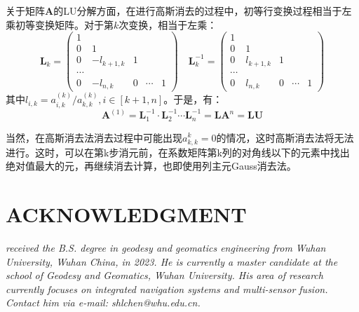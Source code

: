 \documentclass[12pt, onecolumn]{article}
\newcommand\normf{\fangsong}
\begin{document}
	关于矩阵$\boldsymbol{A}$的LU分解方面，在进行高斯消去的过程中，初等行变换过程相当于左乘初等变换矩阵。对于第$k$次变换，相当于左乘：
	\begin{equation}
	\boldsymbol{L}_k=\begin{pmatrix}
	1\\
	0&1\\
	0&-l_{k+1,k}&1\\
	\cdots\\
	0&-l_{n,k}&0&\cdots&1
	\end{pmatrix}
	\quad
	\boldsymbol{L}_k^{-1}=\begin{pmatrix}
		1\\
		0&1\\
		0&l_{k+1,k}&1\\
		\cdots\\
		0&l_{n,k}&0&\cdots&1
		\end{pmatrix}
	\end{equation}
	其中$l_{i,k}=a^{(k)}_{i,k}/a^{(k)}_{k,k},i\in[k+1,n]$。于是，有：
	\begin{equation}
	\boldsymbol{A}^{(1)}=\boldsymbol{L}_1^{-1}\cdot\boldsymbol{L}_2^{-1}\cdots
	\boldsymbol{L}_n^{-1}=\boldsymbol{L}\boldsymbol{A}^{n}=\boldsymbol{LU}
	\end{equation}
	
	当然，在高斯消去法消去过程中可能出现$a_{k,k}^{k}=0$的情况，这时高斯消去法将无法进行。这时，可以在第k步消元前，在系数矩阵第k列的对角线以下的元素中找出绝对值最大的元，再继续消去计算，也即使用列主元Gauss消去法。
	
	
	\subsection{\normf{实验结果}}
	\subsection{\normf{关键代码}}
	
	\newpage
	\section{ACKNOWLEDGMENT}
	\begin{tcolorbox}[colback=white,colframe=white!70!black,title={\bfseries Author Information}]
	\par\noindent
		\parbox[t]{\linewidth}{
	 \noindent{}
	 \emph{
	 received the B.S. degree in geodesy and geomatics engineering from Wuhan University, Wuhan China, in 2023.
	 He is currently a master candidate at the school of Geodesy and Geomatics, Wuhan University. His area of research currently focuses on integrated navigation systems and multi-sensor fusion.
	 Contact him via e-mail: shlchen@whu.edu.cn.
	 }}
	\end{tcolorbox}
		
		
\end{document}
